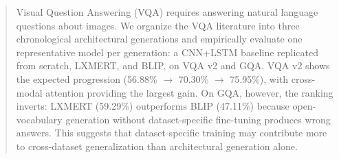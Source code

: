 \begin{abstract}
Visual Question Answering (VQA) requires answering natural language questions about images. We organize the VQA literature into three chronological architectural generations and empirically evaluate one representative model per generation: a CNN+LSTM baseline replicated from scratch, LXMERT, and BLIP, on VQA v2 and GQA. VQA v2 shows the expected progression (56.88\% $\rightarrow$ 70.30\% $\rightarrow$ 75.95\%), with cross-modal attention providing the largest gain. On GQA, however, the ranking inverts: LXMERT (59.29\%) outperforms BLIP (47.11\%) because open-vocabulary generation without dataset-specific fine-tuning produces wrong answers. This suggests that dataset-specific training may contribute more to cross-dataset generalization than architectural generation alone.
\end{abstract}

